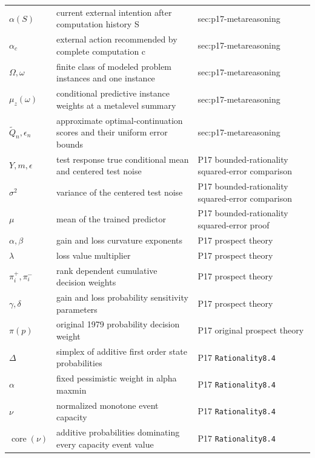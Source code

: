 \begin{longtable}{@{}p{}p{}p{}@{}}
\(\alpha(S)\) & current external intention after computation history S & sec:\allowbreak{}p17-\allowbreak{}metareasoning \\
\(\alpha_c\) & external action recommended by complete computation c & sec:\allowbreak{}p17-\allowbreak{}metareasoning \\
\(\Omega,\allowbreak \omega\) & finite class of modeled problem instances and one instance & sec:\allowbreak{}p17-\allowbreak{}metareasoning \\
\(\mu_z(\omega)\) & conditional predictive instance weights at a metalevel summary & sec:\allowbreak{}p17-\allowbreak{}metareasoning \\
\(\widetilde Q_n,\allowbreak \epsilon_n\) & approximate optimal-continuation scores and their uniform error bounds & sec:\allowbreak{}p17-\allowbreak{}metareasoning \\
\(Y,\allowbreak m,\allowbreak \epsilon\) & test response true conditional mean and centered test noise & P17 bounded-\allowbreak{}rationality squared-\allowbreak{}error comparison \\
\(\sigma^2\) & variance of the centered test noise & P17 bounded-\allowbreak{}rationality squared-\allowbreak{}error comparison \\
\(\mu\) & mean of the trained predictor & P17 bounded-\allowbreak{}rationality squared-\allowbreak{}error proof \\
\(\alpha,\allowbreak \beta\) & gain and loss curvature exponents & P17 prospect theory \\
\(\lambda\) & loss value multiplier & P17 prospect theory \\
\(\pi_i^+,\allowbreak \pi_i^-\) & rank dependent cumulative decision weights & P17 prospect theory \\
\(\gamma,\allowbreak \delta\) & gain and loss probability sensitivity parameters & P17 prospect theory \\
\(\pi(p)\) & original 1979 probability decision weight & P17 original prospect theory \\
\(\Delta\) & simplex of additive first order state probabilities & P17 \texttt{Rationality8.\allowbreak{}4} \\
\(\alpha\) & fixed pessimistic weight in alpha maxmin & P17 \texttt{Rationality8.\allowbreak{}4} \\
\(\nu\) & normalized monotone event capacity & P17 \texttt{Rationality8.\allowbreak{}4} \\
\(\operatorname{core}(\nu)\) & additive probabilities dominating every capacity event value & P17 \texttt{Rationality8.\allowbreak{}4} \\

\end{longtable}
